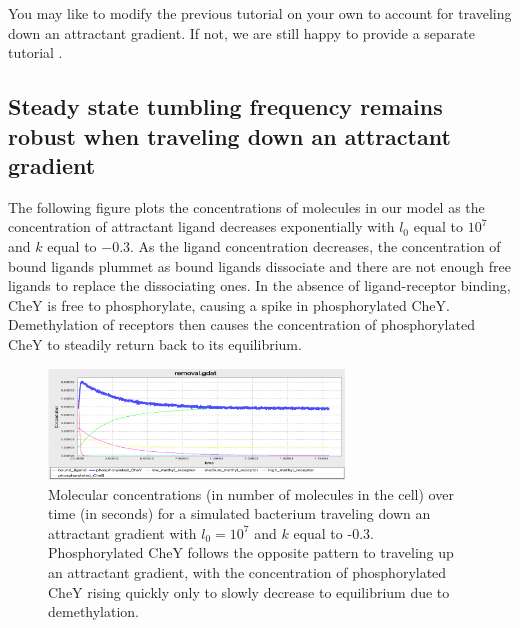 \begin{qbox}\end{qbox}

You may like to modify the previous tutorial on your own to account for traveling down an attractant gradient. If not, we are still happy to provide a separate tutorial .


\FloatBarrier
{}
\subsection{Steady state tumbling frequency remains robust when traveling down an attractant gradient}

The following figure plots the concentrations of molecules in our model as the concentration of attractant ligand decreases exponentially with $l_0$ equal to $10^7$ and $k$ equal to $-0.3$. As the ligand concentration decreases, the concentration of bound ligands plummet as bound ligands dissociate and there are not enough free ligands to replace the dissociating ones. In the absence of ligand-receptor binding, CheY is free to phosphorylate, causing a spike in phosphorylated CheY. Demethylation of receptors then causes the concentration of phosphorylated CheY to steadily return back to its equilibrium.


\begin{figure}[h]
\centering
\mySfFamily
\includegraphics[width = 0.7\textwidth]{../images/chemotaxis_tutorial_removal01.png}
\caption{Molecular concentrations (in number of molecules in the cell) over time (in seconds) for a simulated bacterium traveling down an attractant gradient with $l_0 = 10^7$ and $k$ equal to -0.3. Phosphorylated CheY follows the opposite pattern to traveling up an attractant gradient, with the concentration of phosphorylated CheY rising quickly only to slowly decrease to equilibrium due to demethylation.}
\label{fig:chemotaxis_tutorial_removal01}
\end{figure}


